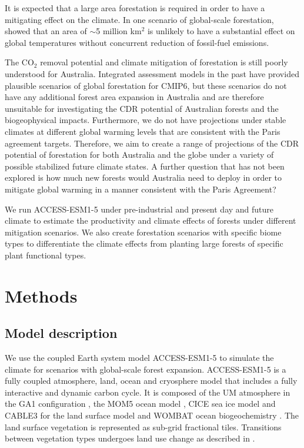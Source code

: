 \documentclass[]{article}
\begin{document}
It is expected that a large area forestation is required in order to have a mitigating effect on the climate.
In one scenario of global-scale forestation, \cite{loughran_limited_2023} showed that an area of $\sim$5 million km$^2$ is unlikely to have a substantial effect on global temperatures without concurrent reduction of fossil-fuel emissions.

The CO$_2$ removal potential and climate mitigation of forestation is still poorly understood for Australia.
Integrated assessment models in the past have provided plausible scenarios of global forestation for CMIP6, but these scenarios do not have any additional forest area expansion in Australia \parencite{loughran_limited_2023} and are therefore unsuitable for investigating the CDR potential of Australian forests and the biogeophysical impacts.
Furthermore, we do not have projections under stable climates at different global warming levels that are consistent with the Paris agreement targets.
Therefore, we aim to create a range of projections of the CDR potential of forestation for both Australia and the globe under a variety of possible stabilized future climate states.
A further question that has not been explored is how much new forests would Australia need to deploy in order to mitigate global warming in a manner consistent with the Paris Agreement?

We run ACCESS-ESM1-5 under pre-industrial and present day and future climate to estimate the productivity and climate effects of forests under different mitigation scenarios.
We also create forestation scenarios with specific biome types to differentiate the climate effects from planting large forests of specific plant functional types.

\section{Methods}

\subsection{Model description}

We use the coupled Earth system model ACCESS-ESM1-5 to simulate the climate for scenarios with global-scale forest expansion.
ACCESS-ESM1-5 is a fully coupled atmosphere, land, ocean and cryosphere model that includes a fully interactive and dynamic carbon cycle.
It is composed of the UM atmosphere in the GA1 configuration \parencite{martin_analysis_2010}, the MOM5 ocean model \parencite{griffies_elements_2012}, CICE sea ice model \parencite{hunke_cice_nodate} and CABLE3 for the land surface model and WOMBAT ocean biogeochemistry \parencite{law_carbon_2017}.
The land surface vegetation is represented as sub-grid fractional tiles.
Transitions between vegetation types undergoes land use change as described in \cite{ziehn_australian_2020}.
\end{document}
